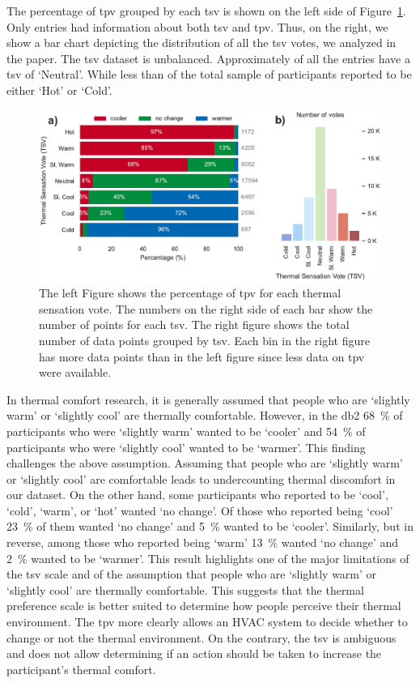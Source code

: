 The percentage of \ac{tpv} grouped by each \ac{tsv} is shown on the left side of Figure~\ref{fig:bar_plot_tp_by_ts}.
Only  entries had information about both \ac{tsv} and \ac{tpv}.
Thus, on the right, we show a bar chart depicting the distribution of all the \ac{tsv} votes, we analyzed in the paper.
The \ac{tsv} dataset is unbalanced.
Approximately  of all the entries have a \ac{tsv} of `Neutral'.
While less than  of the total sample of participants reported to be either `Hot' or `Cold'.
\begin{figure}[htb!]
    \centering
    \includegraphics[width=\textwidth]{figures/bar_plot_tp_by_ts}
    \caption{The left Figure shows the percentage of \ac{tpv} for each thermal sensation vote.
    The numbers on the right side of each bar show the number of points for each \ac{tsv}.
    The right figure shows the total number of data points grouped by \ac{tsv}.
    Each bin in the right figure has more data points than in the left figure since less data on \ac{tpv} were available.}
    \label{fig:bar_plot_tp_by_ts}
\end{figure}

In thermal comfort research, it is generally assumed that people who are `slightly warm' or `slightly cool' are thermally comfortable.
However, in the \ac{db2} \qty{68}{\percent} of participants who were `slightly warm' wanted to be `cooler' and \qty{54}{\percent} of participants who were `slightly cool' wanted to be `warmer'.
This finding challenges the above assumption.
Assuming that people who are `slightly warm' or `slightly cool' are comfortable leads to undercounting thermal discomfort in our dataset.
On the other hand, some participants who reported to be `cool', `cold', `warm', or `hot' wanted `no change'.
Of those who reported being `cool' \qty{23}{\percent} of them wanted `no change' and \qty{5}{\percent} wanted to be `cooler'.
Similarly, but in reverse, among those who reported being `warm' \qty{13}{\percent} wanted `no change' and \qty{2}{\percent} wanted to be `warmer'.
This result highlights one of the major limitations of the \ac{tsv} scale and of the assumption that people who are `slightly warm' or `slightly cool' are thermally comfortable.
This suggests that the thermal preference scale is better suited to determine how people perceive their thermal environment.
The \ac{tpv} more clearly allows an HVAC system to decide whether to change or not the thermal environment. 
On the contrary, the \ac{tsv} is ambiguous and does not allow determining if an action should be taken to increase the participant's thermal comfort.

